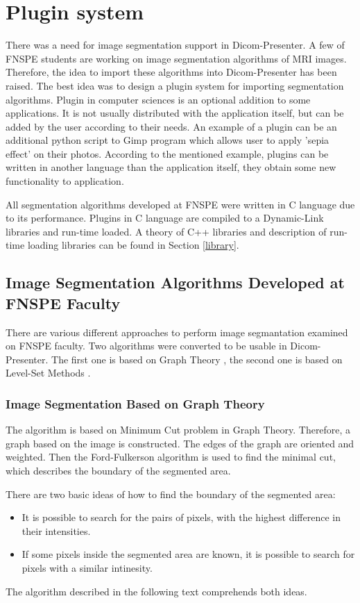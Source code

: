 \chapter{Plugin system}
\vspace{-10mm}

There was a need for image segmentation support in Dicom-Presenter. A few of FNSPE students are working on image segmentation algorithms of MRI images. Therefore, the idea to import these algorithms into Dicom-Presenter has been raised. The best idea was to design a plugin system for importing segmentation algorithms.
Plugin in computer sciences is an optional addition to some applications. It is not usually distributed with the application itself, but can be added by the user according to their needs. An example of a plugin can be an additional python script to Gimp program which allows user to apply 'sepia effect' on their photos. According to the mentioned example, plugins can be written in another language than the application itself, they obtain some new functionality to application.


All segmentation algorithms developed at FNSPE were written in C language due to its performance. Plugins in C language are compiled to a Dynamic-Link libraries and run-time loaded. A theory of C++ libraries and description of run-time loading libraries can be found in Section \ref{library}.

\section{Image Segmentation Algorithms Developed at FNSPE Faculty}
There are various different approaches to perform image segmantation examined on FNSPE faculty. Two algorithms were converted to be usable in Dicom-Presenter. The first one is based on Graph Theory \cite{loucky}, the second one is based on Level-Set Methods \cite{maca}.

\subsection{Image Segmentation Based on Graph Theory}
The algorithm is based on Minimum Cut problem in Graph Theory. Therefore, a graph based on the image is constructed. The edges of the graph are oriented and weighted. Then the Ford-Fulkerson algorithm is used to find the minimal cut, which describes the boundary of the segmented area.

There are two basic ideas of how to find the boundary of the segmented area:
\begin{itemize}
\item It is possible to search for the pairs of pixels, with the highest difference in their intensities.
\item If some pixels inside the segmented area are known, it is possible to search for pixels with a similar intinesity.
\end{itemize}
The algorithm described in the following text comprehends both ideas.

